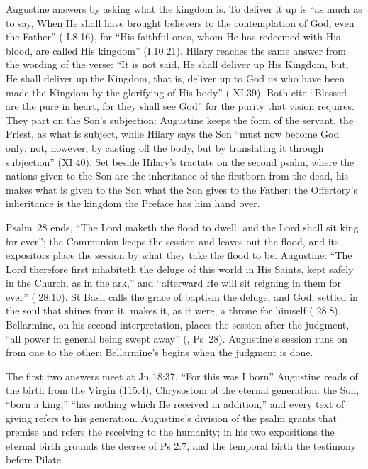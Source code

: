 Augustine answers by asking what the kingdom is. To deliver it up is ``as much
as to say, When He shall have brought believers to the contemplation of God,
even the Father'' ( I.8.16), for ``His faithful ones, whom He
has redeemed with His blood, are called His kingdom'' (I.10.21). Hilary
reaches the same answer from the wording of the verse: ``It is not said, He
shall deliver up His Kingdom, but, He shall deliver up the Kingdom, that is,
deliver up to God us who have been made the Kingdom by the glorifying of His
body'' ( XI.39). Both cite ``Blessed are the pure in heart,
for they shall see God'' for the purity that vision requires. They part on the
Son's subjection: Augustine keeps the form of the servant, the Priest, as what
is subject, while Hilary says the Son ``must now become God only; not,
however, by casting off the body, but by translating it through subjection''
(XI.40). Set beside Hilary's tractate on the second psalm, where the nations
given to the Son are the inheritance of the firstborn from the dead, his
 makes what is given to the Son what the Son gives to the
Father: the Offertory's inheritance is the kingdom the Preface has him hand
over.

Psalm~28 ends, ``The Lord maketh the flood to dwell: and the Lord shall sit
king for ever''; the Communion keeps the session and leaves out the flood, and
its expositors place the session by what they take the flood to be. Augustine: ``The
Lord therefore first inhabiteth the deluge of this world in His Saints, kept
safely in the Church, as in the ark,'' and ``afterward He will sit reigning in
them for ever'' ( 28.10). St Basil calls the
grace of baptism the deluge, and God, settled in the soul that shines from it,
makes it, as it were, a throne for himself ( 28.8).
Bellarmine, on his second interpretation, places the session after the
judgment, ``all power in general being swept away'' (,
Ps~28). Augustine's session runs on from one to the other;
Bellarmine's begins when the judgment is done.

The first two answers meet at Jn 18:37. ``For this was I born''
Augustine reads of the birth from the Virgin (115.4), Chrysostom of the
eternal generation: the Son, ``born a king,'' ``has nothing which He received
in addition,'' and every text of giving refers to his generation. Augustine's
division of the psalm grants that premise and refers the receiving to the
humanity; in his two expositions the eternal birth grounds the decree of Ps
2:7, and the temporal birth the testimony before Pilate.
